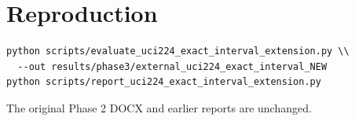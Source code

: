 \documentclass[10pt,a4paper]{article}
\begin{document}
\section{Reproduction}
\begin{verbatim}
python scripts/evaluate_uci224_exact_interval_extension.py \\
  --out results/phase3/external_uci224_exact_interval_NEW
python scripts/report_uci224_exact_interval_extension.py
\end{verbatim}
The original Phase 2 DOCX and earlier reports are unchanged.
\end{document}
